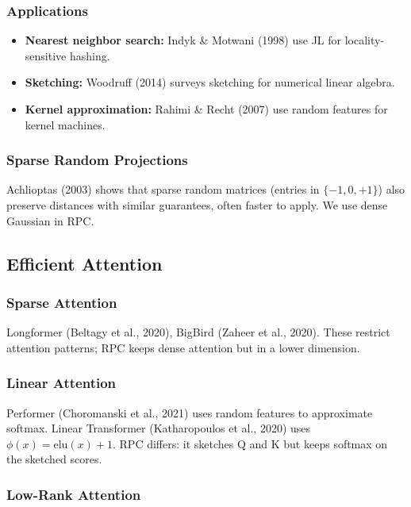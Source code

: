 \subsubsection{Applications}

\begin{itemize}
\item \textbf{Nearest neighbor search:} Indyk \& Motwani (1998) use JL for
  locality-sensitive hashing.
\item \textbf{Sketching:} Woodruff (2014) surveys sketching for numerical linear
  algebra.
\item \textbf{Kernel approximation:} Rahimi \& Recht (2007) use random features
  for kernel machines.

\end{itemize}
\subsubsection{Sparse Random Projections}

Achlioptas (2003) shows that sparse random matrices (entries in 
$\{-1, 0, +1\}$) also preserve distances with similar guarantees, 
often faster to apply. We use dense Gaussian in RPC.

\subsection{Efficient Attention}

\subsubsection{Sparse Attention}

Longformer (Beltagy et al., 2020), BigBird (Zaheer et al., 2020). These 
restrict attention patterns; RPC keeps dense attention but in a lower 
dimension.

\subsubsection{Linear Attention}

Performer (Choromanski et al., 2021) uses random features to approximate 
softmax. Linear Transformer (Katharopoulos et al., 2020) uses $\phi(x) = \text{elu}(x) + 1$. 
RPC differs: it sketches Q and K but keeps softmax on the sketched scores.

\subsubsection{Low-Rank Attention}

